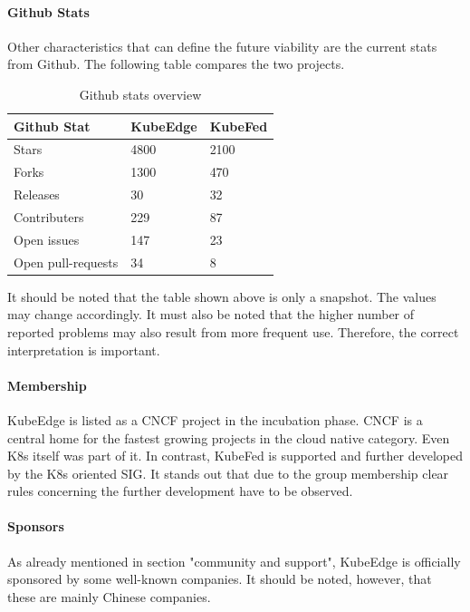\documentclass[MSC,Master,english]{twbook}%
\begin{document}
\paragraph{Github Stats} Other characteristics that can define the future viability are the current stats from Github. The following table compares the two projects.

\begin{table}[ht]
    \begin{center}
        \begin{tabular}{|l|l|l|}
            \hline
            Github Stat & \textbf{KubeEdge} & \textbf{KubeFed} \\
            \hline
            Stars & 4800 & 2100 \\
            Forks & 1300 & 470 \\
            Releases & 30 & 32 \\
            Contributers & 229 & 87 \\
            Open issues & 147 & 23 \\
            Open pull-requests & 34 & 8 \\
            \hline
        \end{tabular}
        \caption{Github stats overview}
        \label{tab:gh-stats}
    \end{center}
\end{table}

It should be noted that the table shown above is only a snapshot. The values may change accordingly. It must also be noted that the higher number of reported problems may also result from more frequent use. Therefore, the correct interpretation is important.

\paragraph{Membership} KubeEdge is listed as a \ac{CNCF} project in the incubation phase. \ac{CNCF} is a central home for the fastest growing projects in the cloud native category. Even \ac{K8s} itself was part of it. In contrast, KubeFed is supported and further developed by the \ac{K8s} oriented \ac{SIG}. It stands out that due to the group membership clear rules concerning the further development have to be observed.

\paragraph{Sponsors} As already mentioned in section "community and support", KubeEdge is officially sponsored by some well-known companies. It should be noted, however, that these are mainly Chinese companies.
\end{document}
